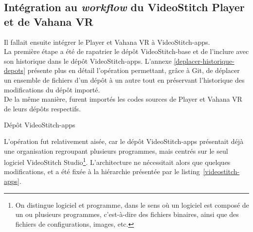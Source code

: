 \subsection{Intégration au \textit{workflow} du VideoStitch Player et de Vahana VR}
\label{integration-apps}
Il fallait ensuite intégrer le Player et Vahana VR à VideoStitch-apps.\\
La première étape a été de rapatrier le dépôt VideoStitch-base et de l'inclure
avec son historique dans le dépôt VideoStitch-apps. L'annexe \ref{deplacer-historique-depots}
présente plus en détail l'opération permettant, grâce à Git, de déplacer un ensemble 
de fichiers d'un dépôt à un autre tout en préservant l'historique des modifications du dépôt importé.\\
De la même manière, furent importés les codes sources de Player et Vahana VR de 
leurs dépôts respectifs.\\
\begin{listing}
  \caption{Dépôt VideoStitch-apps}
  \label{videostitch-apps}
\end{listing}
L'opération fut relativement aisée, car le dépôt VideoStitch-apps présentait déjà
une organisation regroupant plusieurs programmes, mais centrés sur le seul logiciel
VideoStitch Studio\footnote{On distingue logiciel et programme, dans le sens où un logiciel
est composé de un ou plusieurs programmes, c'est-à-dire des fichiers binaires, ainsi que des
fichiers de configurations, images, etc.\cite{logiciel}}. L'architecture ne nécessitait alors que quelques modifications, et
a été fixée à la hiérarchie présentée par le listing~\ref{videostitch-apps}.\\
